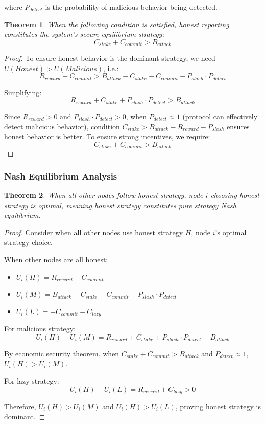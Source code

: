 \documentclass[12pt]{article}
\newtheorem{theorem}{Theorem}
\begin{document}
where $P_{detect}$ is the probability of malicious behavior being detected.

\begin{theorem}
When the following condition is satisfied, honest reporting constitutes the system's secure equilibrium strategy:
$$C_{stake} + C_{commit} > B_{attack}$$
\end{theorem}

\begin{proof}
To ensure honest behavior is the dominant strategy, we need $U(Honest) > U(Malicious)$, i.e.:
$$R_{reward} - C_{commit} > B_{attack} - C_{stake} - C_{commit} - P_{slash} \cdot P_{detect}$$

Simplifying:
$$R_{reward} + C_{stake} + P_{slash} \cdot P_{detect} > B_{attack}$$

Since $R_{reward} > 0$ and $P_{slash} \cdot P_{detect} > 0$, when $P_{detect} \approx 1$ (protocol can effectively detect malicious behavior), condition $C_{stake} > B_{attack} - R_{reward} - P_{slash}$ ensures honest behavior is better. To ensure strong incentives, we require:
$$C_{stake} + C_{commit} > B_{attack}$$
\end{proof}

\subsubsection{Nash Equilibrium Analysis}

\begin{theorem}
When all other nodes follow honest strategy, node $i$ choosing honest strategy is optimal, meaning honest strategy constitutes pure strategy Nash equilibrium.
\end{theorem}

\begin{proof}
Consider when all other nodes use honest strategy $H$, node $i$'s optimal strategy choice.

When other nodes are all honest:
\begin{itemize}
\item $U_i(H) = R_{reward} - C_{commit}$
\item $U_i(M) = B_{attack} - C_{stake} - C_{commit} - P_{slash} \cdot P_{detect}$
\item $U_i(L) = -C_{commit} - C_{lazy}$
\end{itemize}

For malicious strategy:
$$U_i(H) - U_i(M) = R_{reward} + C_{stake} + P_{slash} \cdot P_{detect} - B_{attack}$$

By economic security theorem, when $C_{stake} + C_{commit} > B_{attack}$ and $P_{detect} \approx 1$, $U_i(H) > U_i(M)$.

For lazy strategy:
$$U_i(H) - U_i(L) = R_{reward} + C_{lazy} > 0$$

Therefore, $U_i(H) > U_i(M)$ and $U_i(H) > U_i(L)$, proving honest strategy is dominant.
\end{proof}
\end{document}
